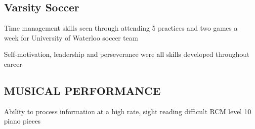\documentclass[letterpaper]{deedy-resume} %
\begin{document}
\begin{minipage}[t]{0.33\textwidth}
\subsection{Varsity Soccer}

\begin{tightitemize}

\sectionspace
    \item Time management skills seen through attending 5 practices and two games a week for University of Waterloo soccer team
    \item Self-motivation, leadership and perseverance were all skills developed throughout career


\end{tightitemize}



\sectionspace
\subsection{MUSICAL PERFORMANCE}

\begin{tightitemize}

\sectionspace 

    \item Ability to process information at a high rate, sight reading difficult RCM level 10 piano pieces
    
    

\end{tightitemize}





\end{minipage} %
\hfill
%
%
\end{document}
